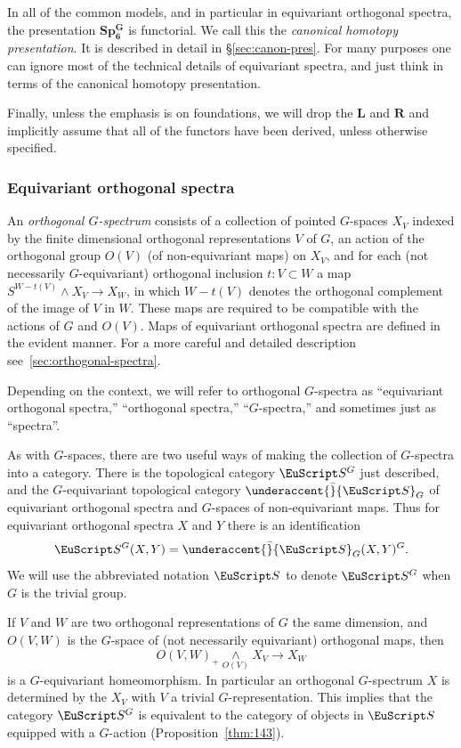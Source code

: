 \documentclass{amsart}
\theoremstyle{definition}
\theoremstyle{remark}
\newcommand{\spectra}{\EuScript S}
\newcommand{\gspectra}[1]{\underaccent{\bar}{\spectra}_{#1}}
\newcommand{\ugspectra}[1]{\spectra^{#1}}
\newcommand{\lder}{\mathbf{L}}
\newcommand{\rder}{\mathbf{R}}
\newcommand{\gswdes}[1]{\mathbf{Sp^{G}_{#1}}}
\begin{document}
In all of the common models, and in particular in equivariant
orthogonal spectra, the presentation $\gswdes{6}$ is functorial.  We
call this the {\em canonical homotopy presentation}.  It is described
in detail in \S\ref{sec:canon-pres}.  For many purposes one can ignore
most of the technical details of equivariant spectra, and just think
in terms of the canonical homotopy presentation.  



Finally, unless the emphasis is on foundations, we will drop the
$\lder$ and $\rder$ and implicitly assume that all of the functors
have been derived, unless otherwise specified.


\subsubsection{Equivariant orthogonal spectra}
\label{sec:equiv-orth-spectra-1}

An {\em orthogonal $G$-spectrum} consists of a collection of pointed
$G$-spaces $X_{V}$ indexed by the finite dimensional orthogonal
representations $V$ of $G$, an action of the orthogonal group $O(V)$
(of non-equivariant maps) on $X_{V}$, and for each (not necessarily
$G$-equivariant) orthogonal inclusion $t:V\subset W$ a map
$S^{W-t(V)}\wedge X_{V}\to X_{W}$, in which $W-t(V)$ denotes the
orthogonal complement of the image of $V$ in $W$.  These maps are
required to be compatible with the actions of $G$ and $O(V)$.  Maps of
equivariant orthogonal spectra are defined in the evident manner.  For
a more careful and detailed description
see~\ref{sec:orthogonal-spectra}.



Depending on the context, we will refer to orthogonal $G$-spectra as
``equivariant orthogonal spectra,'' ``orthogonal spectra,''
``$G$-spectra,'' and sometimes just as ``spectra''.

As with $G$-spaces, there are two useful ways of making the collection
of $G$-spectra into a category.  There is the topological category
$\ugspectra{G}$ just described, and the $G$-equivariant topological
category $\gspectra{G}$ of equivariant orthogonal spectra and
$G$-spaces of non-equivariant maps.  Thus for equivariant orthogonal
spectra $X$ and $Y$ there is an identification
\[
\ugspectra{G}(X,Y) = \gspectra{G}(X,Y)^{G}.
\]
We will use the abbreviated notation $\spectra$ to denote
$\ugspectra{G}$ when $G$ is the trivial group.

If $V$ and $W$ are two orthogonal representations of $G$ the same
dimension, and $O(V,W)$ is the $G$-space of (not necessarily
equivariant) orthogonal maps, then
\[
O(V,W)_{+}\underset{O(V)}{\wedge}X_{V}\to X_{W}
\]
is a $G$-equivariant homeomorphism.  In particular an orthogonal
$G$-spectrum $X$ is determined by the $X_{V}$ with $V$ a trivial
$G$-representation.  This implies that the category $\ugspectra{G}$ is
equivalent to the category of objects in $\spectra$ equipped with a
$G$-action (Proposition~\ref{thm:143}).
\end{document}
